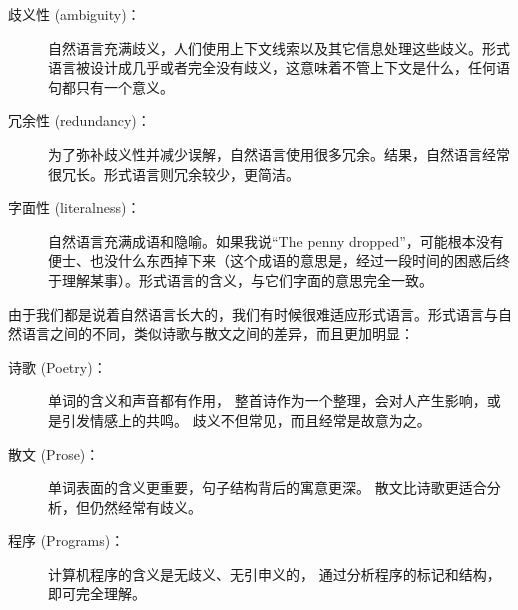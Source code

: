 \begin{description}

\item[歧义性 (ambiguity)：] 自然语言充满歧义，人们使用上下文线索以及其它信息处理这些歧义。形式语言被设计成几乎或者完全没有歧义，这意味着不管上下文是什么，任何语句都只有一个意义。

\item[冗余性 (redundancy)：] 为了弥补歧义性并减少误解，自然语言使用很多冗余。结果，自然语言经常很冗长。形式语言则冗余较少，更简洁。

\item[字面性 (literalness)：] 自然语言充满成语和隐喻。如果我说``The penny dropped''，可能根本没有便士、也没什么东西掉下来（这个成语的意思是，经过一段时间的困惑后终于理解某事）。形式语言的含义，与它们字面的意思完全一致。

\end{description}


由于我们都是说着自然语言长大的，我们有时候很难适应形式语言。形式语言与自然语言之间的不同，类似诗歌与散文之间的差异，而且更加明显：
 


\begin{description}

\item[诗歌 (Poetry)：] 单词的含义和声音都有作用， 整首诗作为一个整理，会对人产生影响，或是引发情感上的共鸣。 歧义不但常见，而且经常是故意为之。

\item[散文 (Prose)：] 单词表面的含义更重要，句子结构背后的寓意更深。 散文比诗歌更适合分析，但仍然经常有歧义。

\item[程序 (Programs)：] 计算机程序的含义是无歧义、无引申义的， 通过分析程序的标记和结构，即可完全理解。

\end{description}

